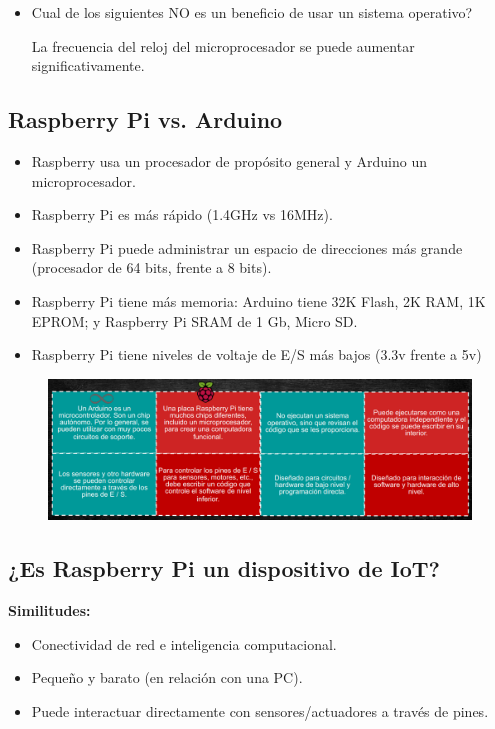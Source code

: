\documentclass[12pt]{report} %
\begin{document}
\begin{itemize}

\item Cual de los siguientes NO es un beneficio de usar un sistema operativo? 

La frecuencia del reloj del microprocesador se puede aumentar significativamente.
\end{itemize}
	
\subsection{Raspberry Pi vs. Arduino}
\begin{itemize}
	\item Raspberry usa un procesador de propósito general y Arduino un microprocesador.
	\item Raspberry Pi es más rápido (1.4GHz vs 16MHz).
	\item Raspberry Pi puede administrar un espacio de direcciones más grande (procesador de 64 bits, frente a 8 bits).
	\item Raspberry Pi tiene más memoria: Arduino tiene 32K Flash, 2K RAM, 1K EPROM; y Raspberry Pi SRAM de 1 Gb, Micro SD.
	\item Raspberry Pi tiene niveles de voltaje de E/S más bajos (3.3v frente a 5v)
\end{itemize}

\begin{figure}[H]
	{\includegraphics[scale=.62]{2021-03-24 19_03_44-Tema 03 - Gateways IoT - Sistemas Embebidos.png}}
\end{figure}

\subsection{¿Es Raspberry Pi un dispositivo de IoT?}

\textbf{Similitudes:}
\begin{itemize}
	\item Conectividad de red e inteligencia computacional.
	\item Pequeño y barato (en relación con una PC).
	\item Puede interactuar directamente con sensores/actuadores a través de pines.
\end{itemize}
\end{document}

